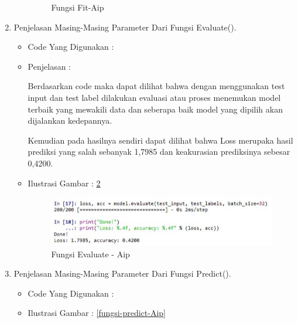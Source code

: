 \begin{enumerate}
\begin{itemize}
\begin{figure}[!hbtp]
\caption{Fungsi Fit-Aip}
\label{fungsi-fit-Aip}
\end{figure}
\par
\end{itemize}
\par
\par
\item Penjelasan Masing-Masing Parameter Dari Fungsi Evaluate().
\begin{itemize}
\item Code Yang Digunakan :
\par

\par
\item Penjelasan :
\par Berdasarkan code maka dapat dilihat bahwa dengan menggunakan test input dan test label dilakukan evaluasi atau proses menemukan model terbaik yang mewakili data dan seberapa baik model yang dipilih akan dijalankan kedepannya. 
\par Kemudian pada hasilnya sendiri dapat dilihat bahwa Loss merupaka hasil prediksi yang salah sebanyak 1,7985 dan keakurasian prediksinya sebesar 0,4200.
\par
\par
\item Ilustrasi Gambar : \ref{fungsi-evaluate-Aip}
\par
\begin{figure}[!hbtp]
\centering
\includegraphics[scale=0.2]{figures/AIP/evaluate.PNG}
\caption{Fungsi Evaluate - Aip}
\label{fungsi-evaluate-Aip}
\end{figure}
\par
\par
\par
\end{itemize}
\item Penjelasan Masing-Masing Parameter Dari Fungsi Predict().
\begin{itemize}
\item Code Yang Digunakan :
\par

\par
\par
\item Ilustrasi Gambar : \ref{fungsi-predict-Aip}

\end{itemize}
\end{enumerate}

